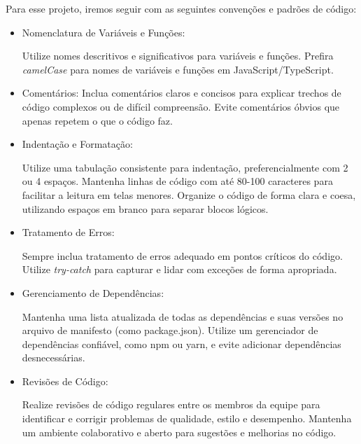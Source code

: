 Para esse projeto, iremos seguir com as seguintes convenções e padrões de código:

\begin{itemize}
    \item Nomenclatura de Variáveis e Funções:

Utilize nomes descritivos e significativos para variáveis e funções.
Prefira \textit{camelCase} para nomes de variáveis e funções em JavaScript/TypeScript.

    \item Comentários:
Inclua comentários claros e concisos para explicar trechos de código complexos ou de difícil compreensão.
Evite comentários óbvios que apenas repetem o que o código faz.

    \item Indentação e Formatação:

Utilize uma tabulação consistente para indentação, preferencialmente com 2 ou 4 espaços.
Mantenha linhas de código com até 80-100 caracteres para facilitar a leitura em telas menores.
Organize o código de forma clara e coesa, utilizando espaços em branco para separar blocos lógicos.

    \item Tratamento de Erros:

Sempre inclua tratamento de erros adequado em pontos críticos do código.
Utilize \textit{try-catch} para capturar e lidar com exceções de forma apropriada.

    \item Gerenciamento de Dependências:

Mantenha uma lista atualizada de todas as dependências e suas versões no arquivo de manifesto (como package.json).
Utilize um gerenciador de dependências confiável, como \acs{npm} ou \acs{yarn}, e evite adicionar dependências desnecessárias.

    \item Revisões de Código:

Realize revisões de código regulares entre os membros da equipe para identificar e corrigir problemas de qualidade, estilo e desempenho.
Mantenha um ambiente colaborativo e aberto para sugestões e melhorias no código.

\end{itemize}

\newpage

